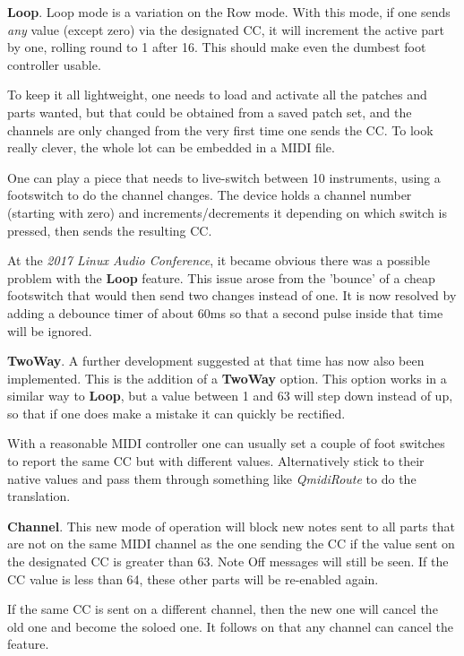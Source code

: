    \textbf{Loop}.  Loop mode is a variation on the Row mode.
   With this mode, if one sends \textsl{any} value (except zero)
   via the designated CC,
   it will increment the active part by one, rolling round to 1 after 16.
   This should make even the dumbest foot controller usable.

   To keep it all lightweight, one needs to load and activate all the patches
   and parts wanted, but that could be obtained from a saved patch set, and the
   channels are only changed from the very first time one sends the CC.  To
   look really clever, the whole lot can be embedded in a MIDI file.

   One can play a piece that needs to live-switch between 10 instruments, using
   a footswitch to do the channel changes. The device holds a channel
   number (starting with zero) and increments/decrements it depending on which
   switch is pressed, then sends the resulting CC.

   At the \textsl{2017 Linux Audio Conference},
   it became obvious there was a possible problem with the \textbf{Loop}
   feature. This issue arose from the 'bounce' of a cheap footswitch that would
   then send two changes instead of one. It is now resolved by adding a
   debounce timer of about 60ms so that a second pulse inside that time will be
   ignored.

   \textbf{TwoWay}.
   A further development suggested at that time has now also been implemented. This
   is the addition of a \textbf{TwoWay} option.
   This option works in a similar way to \textbf{Loop}, but
   a value between 1 and 63 will step down instead of up, so that if one does make
   a mistake it can quickly be rectified.

   With a reasonable MIDI controller one can usually set a couple of foot switches
   to report the same CC but with different values. Alternatively stick to their
   native values and pass them through something like \textsl{QmidiRoute} to do the
   translation.

   \textbf{Channel}.
   This new mode of operation will block new notes sent to all parts that are not
   on the same MIDI channel as the one sending the CC if the value sent on the
   designated CC is greater than 63. Note Off messages will still be seen. If the
   CC value is less than 64, these other parts will be re-enabled again.

   If the same CC is sent on a different channel, then the new one will cancel the
   old one and become the soloed one. It follows on that any channel can cancel the
   feature.

